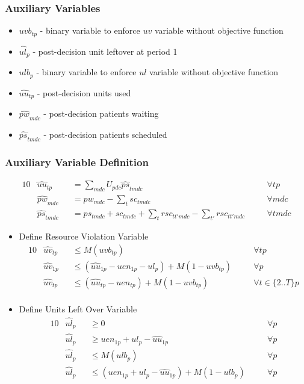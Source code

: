 \documentclass{article}
\begin{document}
\subsubsection{Auxiliary Variables}
\begin{itemize}
	\item $uvb_{tp}$ - binary variable to enforce $uv$ variable without objective function
	\item $\hat{ul}_{p}$ - post-decision unit leftover at period 1
	\item $ulb_{p}$ - binary variable to enforce $ul$ variable without objective function
	\item $\hat{uu}_{tp}$ - post-decision units used
	\item $\hat{pw}_{mdc}$ - post-decision patients waiting
	\item $\hat{ps}_{tmdc}$ - post-decision patients scheduled
\end{itemize}
\subsubsection{Auxiliary Variable Definition}
\label{auxiliary constraints}
\begin{alignat}{10}
	& \hat{uu}_{tp} 
		&& =  \sum_{mdc} U_{pdc} \hat{ps}_{tmdc} \quad
		&& \forall tp \\ 
	& \hat{pw}_{mdc} 
		&& = pw_{mdc} - \sum_{t} sc_{tmdc} \quad 
		&& \forall mdc \\ 
	& \hat{ps}_{tmdc} 
		&& = ps_{tmdc} + sc_{tmdc} + 
			\sum_{t} rsc_{tt'mdc} - \sum_{t'} rsc_{tt'mdc} \quad 
		&& \forall tmdc
\end{alignat}

\begin{itemize}

	\item Define Resource Violation Variable
	\begin{alignat}{10}
			& \hat{uv}_{tp} 
				&& \le  M(uvb_{tp}) \quad
				&& \forall tp \\
			& \hat{uv}_{1p} 
				&& \le  (\hat{uu}_{1p} - uen_{1p} - ul_{p}) + M(1-uvb_{tp}) \quad
				&& \forall p \\
			& \hat{uv}_{tp} 
				&& \le  (\hat{uu}_{tp} - uen_{tp}) + M(1-uvb_{tp}) \quad
				&& \forall t \in \{ 2..T \} p \\
	\end{alignat}
	
	\item Define Units Left Over Variable
	\begin{alignat}{10}
			& \hat{ul}_{p} 
				&& \ge 0 \quad 
				&& \forall p \\
			& \hat{ul}_{p} 
				&& \ge uen_{1p} + ul_{p} - \hat{uu}_{1p} \quad 
				&& \forall p \\
			& \hat{ul}_{p} 
				&& \le M (ulb_{p}) \quad 
				&& \forall p \\
			& \hat{ul}_{p} 
				&& \le (uen_{1p} + ul_{p} - \hat{uu}_{1p}) + M(1-ulb_{p}) \quad 
				&& \forall p 
	\end{alignat}
\end{itemize}
\end{document}
